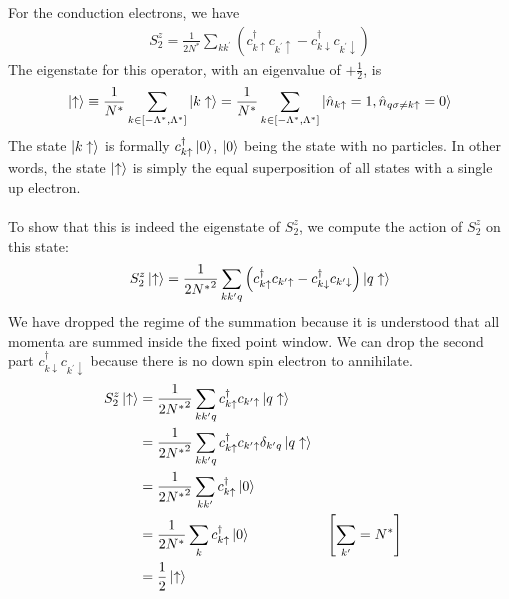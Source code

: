\documentclass[twoside]{report}
\numberwithin{equation}{section}
\begin{document}
For the conduction electrons, we have
\begin{equation}\begin{aligned}
	S_2^z = \frac{1}{2N^*}\sum_{kk^\prime}\left(c^\dagger_{k \uparrow}c_{k^\prime \uparrow} - c^\dagger_{k \downarrow}c_{k^\prime \downarrow}\right)
\end{aligned}\end{equation}
The eigenstate for this operator, with an eigenvalue of \(+ \frac{1}{2}\), is
\begin{equation}\begin{aligned}
\ket{\uparrow} \equiv \frac{1}{N^*}\sum_{k \in \left[-\Lambda^*, \Lambda^*\right]} \ket{k \uparrow} = \frac{1}{N^*}\sum_{k \in \left[-\Lambda^*, \Lambda^*\right]}\ket{\hat n_{k \uparrow} = 1, \hat n_{q\sigma \neq k \uparrow} = 0}
\end{aligned}\end{equation}
The state \(\ket{k \uparrow}\) is formally \(c^\dagger_{k \uparrow} \ket{0}\), \(\ket{0}\) being the state with no particles. In other words, the state \(\ket{\uparrow}\) is simply the equal superposition of all states with a single up electron.
\\\\To show that this is indeed the eigenstate of \(S^z_2\), we compute the action of \(S_2^z\) on this state:
\begin{equation}\begin{aligned}
	S_2^z \ket{\uparrow} = \frac{1}{2{N^*}^2}\sum_{kk^\prime q}\left(c^\dagger_{k \uparrow}c_{k^\prime \uparrow} - c^\dagger_{k \downarrow}c_{k^\prime \downarrow}\right)\ket{q \uparrow}
\end{aligned}\end{equation}
We have dropped the regime of the summation because it is understood that all momenta are summed inside the fixed point window. We can drop the second part \(c^\dagger_{k \downarrow}c_{k^\prime \downarrow}\) because there is no down spin electron to annihilate.
\begin{equation}\begin{aligned}
	S_2^z \ket{\uparrow} &= \frac{1}{2{N^*}^2}\sum_{kk^\prime q}c^\dagger_{k \uparrow}c_{k^\prime \uparrow}\ket{q \uparrow}\\
			     &=\frac{1}{2{N^*}^2}\sum_{kk^\prime q}c^\dagger_{k \uparrow}c_{k^\prime \uparrow}\delta_{k^\prime q}\ket{q \uparrow}\\
			     &=\frac{1}{2{N^*}^2}\sum_{kk^\prime}c^\dagger_{k \uparrow}\ket{0}\\
			     &=\frac{1}{2{N^*}}\sum_{k}c^\dagger_{k \uparrow}\ket{0} && \left[\sum_{k^\prime} = N^*\right] \\
			     &=\frac{1}{2}\ket{ \uparrow}
\end{aligned}\end{equation}
\end{document}
